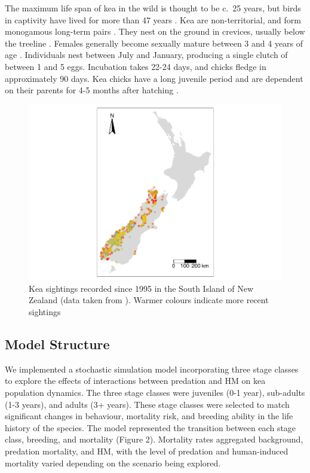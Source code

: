 \documentclass[11pt,]{article}
\begin{document}
The maximum life span of kea in the wild is thought to be c.~25 years,
but birds in captivity have lived for more than 47 years
\citep{brouwer2000}. Kea are non-territorial, and form monogamous
long-term pairs \citep{bond1991}. They nest on the ground in crevices,
usually below the treeline \citep{mccaskill1954}. Females generally
become sexually mature between 3 and 4 years of age \citep{jackson1963}.
Individuals nest between July and January, producing a single clutch of
between 1 and 5 eggs. Incubation takes 22-24 days, and chicks fledge in
approximately 90 days. Kea chicks have a long juvenile period and are
dependent on their parents for 4-5 months after hatching
\citep{orrWalker2010}.

\begin{figure}
\centering
\includegraphics{kea_PVA_manuscript_files/figure-latex/Kea_map-1.pdf}
\caption{Kea sightings recorded since 1995 in the South Island of New
Zealand (data taken from \citet{Gbif2020}). Warmer colours indicate more
recent sightings}
\end{figure}

\hypertarget{model-structure}{%
\subsection{Model Structure}\label{model-structure}}

We implemented a stochastic simulation model incorporating three stage
classes to explore the effects of interactions between predation and HM
on kea population dynamics. The three stage classes were juveniles (0-1
year), sub-adults (1-3 years), and adults (3+ years). These stage
classes were selected to match significant changes in behaviour,
mortality risk, and breeding ability in the life history of the species.
The model represented the transition between each stage class, breeding,
and mortality (Figure 2). Mortality rates aggregated background,
predation mortality, and HM, with the level of predation and
human-induced mortality varied depending on the scenario being explored.
\end{document}
